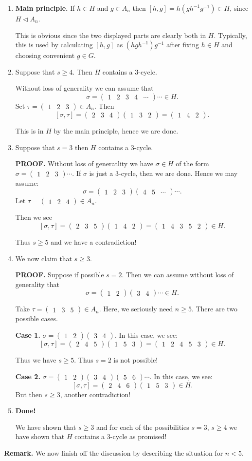 \documentclass[12pt]{article}
\newcommand{\matr}[2]{\left( \begin{array}{*{#1}{r}}#2\end{array}\right)}
\begin{document}
\begin{enumerate}
\item {\bf Main principle.} If $h\in H$ and $g\in A_n$ then
$[h,g] = h(gh^{-1}g^{-1})\in H$, since $H\triangleleft A_n$.

This is obvious since the two displayed parts are clearly both in $H$.
Typically, this is used by calculating $[h,g]$ as $(hgh^{-1})g^{-1}$
after fixing $h\in H$ and choosing convenient $g\in G$.

\item Suppose that $s\geq 4$. Then $H$ contains a $3$-cycle.

Without loss of generality we can assume that
$$\sigma = \matr{5}{1 & 2 & 3 & 4 & \cdots}\cdots \in H.$$
Set $\tau=\matr{3}{1 & 2 & 3}\in A_n.$ Then
$$[\sigma,\tau] = \matr{3}{2 & 3 & 4}\matr{3}{1 & 3 & 2} = \matr{3}{1 & 4
& 2}.$$

This is in $H$ by the main principle, hence we are done.

\item Suppose that $s=3$ then $H$ contains a $3$-cycle.

{\bf PROOF.} Without loss of generatlity we have $\sigma \in H$ of the
form $\sigma=\matr{3}{1 & 2 & 3}\cdots$. If $\sigma$ is just a
$3$-cycle, then we are done. Hence we may assume:
$$\sigma = \matr{3}{1 & 2 & 3}\matr{3}{4 & 5 &\cdots}\cdots.$$
Let $\tau = \matr{3}{1 & 2 & 4} \in A_n$.

Then we see
$$[\sigma,\tau]= \matr{3}{ 2 & 3 & 5}\matr{3}{1 & 4 & 2} = \matr{5}{1 &
4 & 3 & 5 & 2}\in H.$$

Thus $s\geq 5$ and we have a contradiction!

\item We now claim that $s\geq 3.$ 

{\bf PROOF.} Suppose if possible $s=2$. Then we can assume without loss
of generality that
$$\sigma = \matr{2}{1 & 2}\matr{2}{3 & 4}\cdots \in H.$$

Take $\tau=\matr{3}{1 & 3 & 5}\in A_n$. Here, we seriously need $n\geq
5$.
There are two possible cases.

{\bf Case 1.} $\sigma = \matr{2}{1 & 2}\matr{2}{3 & 4}$. In this case,
we see:
$$[\sigma,\tau]= \matr{3}{2 & 4 & 5}\matr{3}{1 & 5 & 3}= \matr{5}{1 & 2
& 4 & 5 & 3}\in H.$$

Thus we have $s\geq 5$. Thus $s=2$ is not possible!

{\bf Case 2.} $\sigma = \matr{2}{1 & 2}\matr{2}{3 & 4} \matr{2}{5 & 6}\cdots $.
In this case, we see:
$$[\sigma,\tau]= \matr{3}{2 & 4 & 6}\matr{3}{1 & 5 & 3}\in H.$$
But then $s\geq 3$, another contradiction!


\item {\bf Done!}

We have shown that $s\geq 3$ and for each of the possibilities
$s=3$, $s\geq 4$ we have shown that $H$ contains a $3$-cycle as promised!



\end{enumerate}
{\bf Remark.}
We now finish off the discussion by describing the situation for $n<5$.
\end{document}
